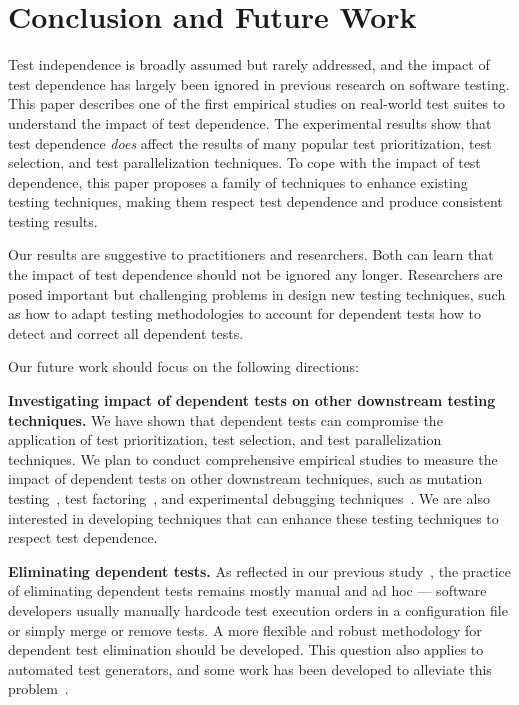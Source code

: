 \section{Conclusion and Future Work}

Test independence is broadly assumed but rarely addressed, and
the impact of test dependence has largely been ignored in previous research
on software testing. This paper describes
one of the first empirical studies on real-world test suites to
understand the impact of test dependence. The experimental
results show that test dependence \textit{does} affect the results
of many popular test prioritization, test selection, and test
parallelization techniques. To cope with the impact of test
dependence, this paper proposes a family of techniques
to enhance existing testing techniques, making them respect test dependence
and produce consistent testing results.


Our results are suggestive to practitioners and researchers.
Both can learn that the impact of test dependence 
should not be ignored any longer. Researchers are posed important
but challenging problems in design new testing techniques,
such as how to adapt testing methodologies to account for
dependent tests how to detect and correct all dependent tests.

Our future work should focus on the following directions:

\vspace{1mm}

\noindent \textbf{{Investigating impact of dependent tests
on other downstream testing techniques.}}
We have shown that dependent tests can compromise the application of
\prionum test prioritization, \selnum test selection,
and \parnum test parallelization techniques.
We plan to conduct comprehensive empirical studies to
measure the impact of dependent tests on other
downstream techniques, such as mutation testing~\cite{},
test factoring~\cite{}, and experimental
debugging techniques~\cite{}.
We are also interested in developing techniques that can enhance these
testing techniques to respect test dependence.



\vspace{1mm}

\noindent \textbf{{Eliminating dependent tests.}}
As reflected in our previous study~\cite{},
the practice of eliminating dependent tests
remains mostly manual and ad hoc --- software developers
usually manually hardcode test
execution orders in a configuration file or
simply merge or remove tests.
A more flexible and robust methodology for
dependent test elimination should be developed.
This question also applies to automated test generators,
and some work has been developed to alleviate
this problem~\cite{vmvm, RobinsonEPAL2011,fraseretal:ISSTA:2011}.





